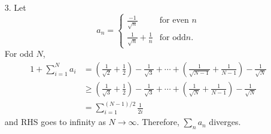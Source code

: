 \documentclass{article}
\begin{document}
\begin{enumerate}
\item[3.] Let
\begin{equation*}
a_n=\begin{cases}
\frac{-1}{\sqrt{n}} & \text{for even }n \\
\frac{1}{\sqrt{n}}+\frac{1}{n} & \text{for odd}n.
\end{cases}
\end{equation*}
For odd $N$, 
\begin{equation*}
\begin{split}
1+\sum\limits_{i=1}^N a_i&=\left(\frac{1}{\sqrt{2}}+\frac{1}{2}\right)-\frac{1}{\sqrt{3}}+\cdots +\left(\frac{1}{\sqrt{N-1}}+\frac{1}{N-1}\right)-\frac{1}{\sqrt{N}} \\
&\geq \left(\frac{1}{\sqrt{3}}+\frac{1}{2}\right)-\frac{1}{\sqrt{3}}+\cdots +\left(\frac{1}{\sqrt{N}}+\frac{1}{N-1}\right)-\frac{1}{\sqrt{N}} \\
&=\sum\limits_{i=1}^{(N-1)/2} \frac{1}{2i}
\end{split}
\end{equation*}
and RHS goes to infinity as $N\rightarrow \infty$. Therefore, $\sum\limits_n a_n$ diverges.


\end{enumerate}
\end{document}
